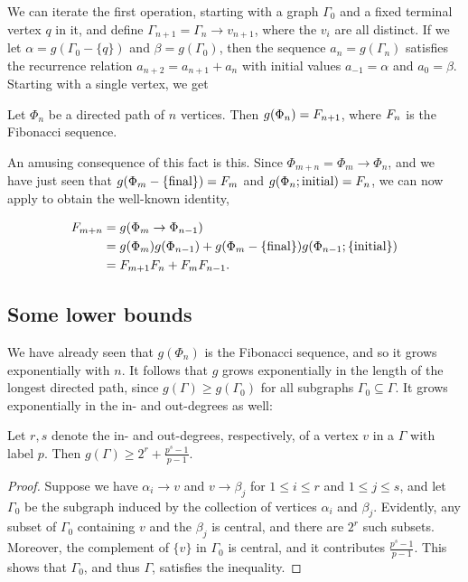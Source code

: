 We can iterate the first operation, starting with a graph $\Gamma_0$ and a fixed terminal vertex $q$ in it,
and define $\Gamma_{n + 1} = \Gamma_{n} \to v_{n + 1}$, where the $v_i$ are all distinct.
If we let $\alpha = g(\Gamma_0 - \{q\})$ and $\beta = g(\Gamma_0)$,
then the sequence $a_n = g(\Gamma_n)$ satisfies the recurrence relation $a_{n + 2} = a_{n + 1} + a_{n}$
with initial values $a_{-1} = \alpha$ and $a_0 = \beta$.
Starting with a single vertex, we get

\begin{prop}
	Let $\Phi_n$ be a directed path of $n$ vertices.
Then $g(\Phi_n) = F_{n + 1}$, where $F_{n}$ is the Fibonacci sequence.
\end{prop}

An amusing consequence of this fact is this.
Since $\Phi_{m + n} = \Phi_m \to \Phi_n$, and we have just seen that $g(\Phi_m - \{\text{final}\}) = F_{m}$ and $g(\Phi_n; \text{initial}) = F_{n}$, 
we can now apply \hyperref[eustick]{} to obtain the well-known identity, \begin{enumrealm}
\begin{align*}
	F_{m + n} &= g(\Phi_m \to \Phi_{n - 1}) \\
	&= g(\Phi_m)g(\Phi_{n - 1}) + g(\Phi_m - \{\text{final}\})g(\Phi_{n - 1}; \{\text{initial}\}) \\
	&= F_{m + 1}F_{n} + F_{m}F_{n - 1}.
\end{align*}\end{enumrealm}
\vspace{-\baselineskip}
\subsection{Some lower bounds}
We have already seen that $g(\Phi_n)$ is the Fibonacci sequence, and so it grows exponentially with $n$.
It follows that $g$ grows exponentially in the length of the longest directed path, since $g(\Gamma) \ge  g(\Gamma_0)$ for all subgraphs $\Gamma_0 \subseteq \Gamma$.
It grows exponentially in the in- and out-degrees as well:
\begin{lem}
	Let $r, s$ denote the in- and out-degrees, respectively, of a vertex $v$ in a  $\Gamma$ with label $p$.
Then $g(\Gamma) \ge 2^r + \frac{p^s - 1}{p - 1}$.
\end{lem}
\begin{proof}
	Suppose we have $\alpha_i \to v$ and $v \to \beta_j$ for $1 \le i \le r$ and $1 \le j \le s$,
	and let $\Gamma_0$ be the subgraph induced by the collection of vertices $\alpha_i$ and $\beta_j$.
	Evidently, any subset of $\Gamma_0$ containing $v$ and the $\beta_j$ is central, and there are $2^r$ such subsets.
	Moreover, the complement of $\{v\}$ in $\Gamma_0$ is central, and it contributes $\frac{p^s - 1}{p - 1}$.
	This shows that $\Gamma_0$, and thus $\Gamma$, satisfies the inequality.
\end{proof}

